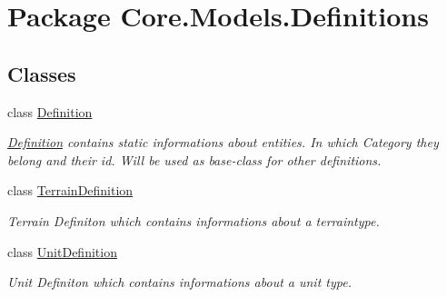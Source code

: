 \hypertarget{namespaceCore_1_1Models_1_1Definitions}{\section{Package Core.\-Models.\-Definitions}
\label{namespaceCore_1_1Models_1_1Definitions}
}
\subsection*{Classes}
\begin{DoxyCompactItemize}
\item 
class \hyperlink{classCore_1_1Models_1_1Definitions_1_1Definition}{Definition}
\begin{DoxyCompactList}\small\item\em \hyperlink{classCore_1_1Models_1_1Definitions_1_1Definition}{Definition} contains static informations about entities. In which Category they belong and their id. Will be used as base-\/class for other definitions. \end{DoxyCompactList}\item 
class \hyperlink{classCore_1_1Models_1_1Definitions_1_1TerrainDefinition}{Terrain\-Definition}
\begin{DoxyCompactList}\small\item\em Terrain Definiton which contains informations about a terraintype. \end{DoxyCompactList}\item 
class \hyperlink{classCore_1_1Models_1_1Definitions_1_1UnitDefinition}{Unit\-Definition}
\begin{DoxyCompactList}\small\item\em Unit Definiton which contains informations about a unit type. \end{DoxyCompactList}\end{DoxyCompactItemize}

